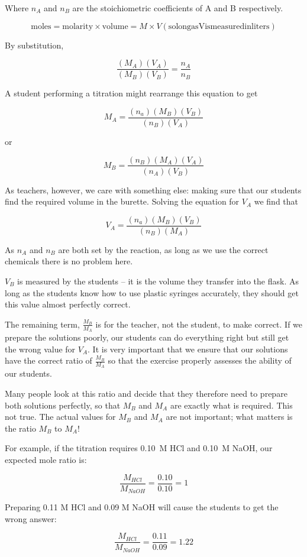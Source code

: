 Where $ n_A $ and $ n_B $ are the stoichiometric coefficients of A and B respectively.

\[ \mathrm{moles} = \mathrm{molarity} \times \mathrm{volume} = M \times V \mathrm{(so long as V is measured in liters)} \]

By substitution,

\[ \frac{(M_A)(V_A)}{(M_B)(V_B)} = \frac{n_A}{n_B} \]

A student performing a titration might rearrange this equation to get

\[ M_A = \frac{(n_a)(M_B)(V_B)}{(n_B)(V_A)} \]

or

\[ M_B = \frac{(n_B)(M_A)(V_A)}{(n_A)(V_B)} \]

As teachers, however, we care with something else: making sure that our students find the required volume in the burette. Solving the equation for $ V_{A} $ we find that

\[ V_A = \frac{(n_a)(M_B)(V_B)}{(n_B)(M_A)} \]

As $ n_A $ and $ n_B $ are both set by the reaction, as long as we use the correct chemicals there is no problem here.

$ V_B $ is measured by the students – it is the volume they transfer into the flask. As long as the students know how to use plastic syringes accurately, they should get this value almost perfectly correct.

The remaining term, $ \frac{M_B}{M_A} $ is for the teacher, not the student, to make correct. If we prepare the solutions poorly, our students can do everything right but still get the wrong value for $ V_A $. It is very important that we ensure that our solutions have the correct ratio of $ \frac{M_B}{M_A} $ so that the exercise properly assesses the ability of our students.

Many people look at this ratio and decide that they therefore need to prepare both solutions perfectly, so that $ M_B $ and $ M_A $ are exactly what is required. This not true. The actual values for $ M_B $ and $ M_A $ are not important; what matters is the ratio $ M_B $ to $ M_A $!

For example, if the titration requires 0.10~M HCl and 0.10~M NaOH, our expected mole ratio is:

\[ \frac{M_{HCl}}{M_{NaOH}} = \frac{0.10}{0.10} = 1 \]

Preparing 0.11 M HCl and 0.09 M NaOH will cause the students to get the wrong answer:

\[ \frac{M_{HCl}}{M_{NaOH}} = \frac{0.11}{0.09} = 1.22 \]

